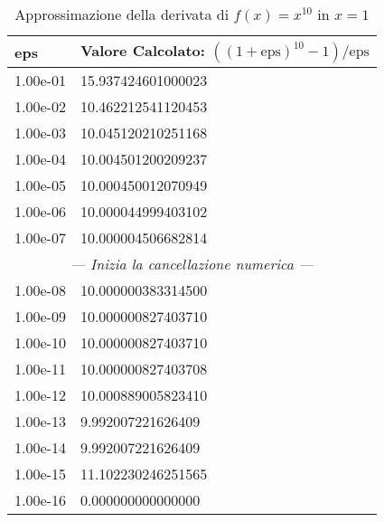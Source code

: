 \begin{table}[h!]
\centering
\caption{Approssimazione della derivata di $f(x)=x^{10}$ in $x=1$}
\begin{tabular}{ll}
\toprule
\textbf{eps} & \textbf{Valore Calcolato: $((1+\text{eps})^{10}-1)/\text{eps}$} \\
\midrule
1.00e-01 & 15.937424601000023 \\
1.00e-02 & 10.462212541120453 \\
1.00e-03 & 10.045120210251168 \\
1.00e-04 & 10.004501200209237 \\
1.00e-05 & 10.000450012070949 \\
1.00e-06 & 10.000044999403102 \\
1.00e-07 & 10.000004506682814 \\
\midrule
\multicolumn{2}{c}{\textit{--- Inizia la cancellazione numerica ---}} \\
\midrule
1.00e-08 & 10.000000383314500 \\
1.00e-09 & 10.000000827403710 \\
1.00e-10 & 10.000000827403710 \\
1.00e-11 & 10.000000827403708 \\
1.00e-12 & 10.000889005823410 \\
1.00e-13 & 9.992007221626409 \\
1.00e-14 & 9.992007221626409 \\
1.00e-15 & 11.102230246251565 \\
1.00e-16 & 0.000000000000000 \\
\bottomrule
\end{tabular}
\end{table}
